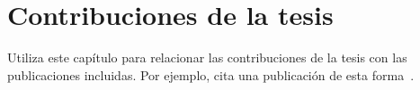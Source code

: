 %

\chapter{Contribuciones de la tesis}
\label{cha:compendium-contributions}


Utiliza este capítulo para relacionar las contribuciones de la tesis con las publicaciones incluidas. Por ejemplo, cita una publicación de esta forma~\cite{garcia2026paper1}.

